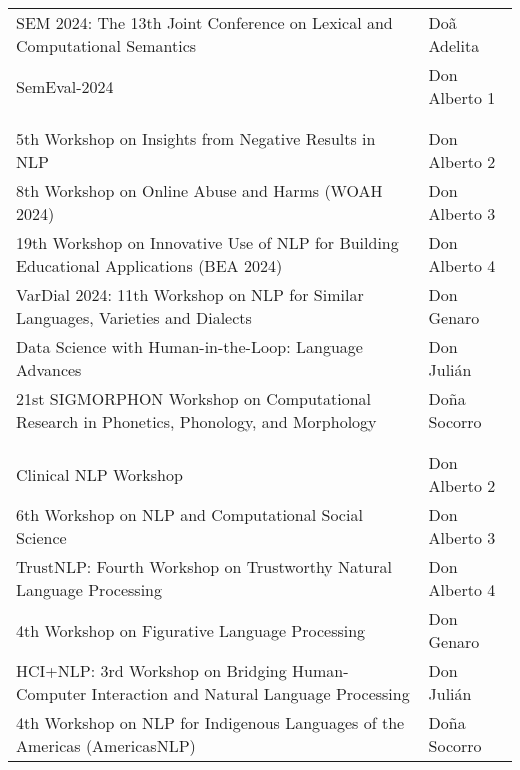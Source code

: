 \begin{center}
\renewcommand{\arraystretch}{1.1}
\vspace{-1em}
\begin{tabular}{@{}%
  >{\raggedright\arraybackslash}p{}
  >{\raggedright\arraybackslash}p{}}

  \multicolumn{2}{l}{\hspace{-1mm}\large Thursday--Friday} \\  \hline
  *SEM 2024: The 13th Joint Conference on Lexical and Computational Semantics & Do\~a Adelita \\
  SemEval-2024 & Don Alberto 1 \\
  \\

  \multicolumn{2}{l}{\hspace{-1mm}\large Thursday} \\ \hline
  5th Workshop on Insights from Negative Results in NLP & Don Alberto 2 \\
  8th Workshop on Online Abuse and Harms (WOAH 2024) & Don Alberto 3 \\
  19th Workshop on Innovative Use of NLP for Building Educational Applications (BEA 2024) & Don Alberto 4 \\
  VarDial 2024: 11th Workshop on NLP for Similar Languages, Varieties and Dialects & Don Genaro \\
  Data Science with Human-in-the-Loop: Language Advances & Don Juli\'an \\
  21st SIGMORPHON Workshop on Computational Research in Phonetics, Phonology, and Morphology & Do\~na Socorro \\
  \\

  \multicolumn{2}{l}{\hspace{-1mm}\large Friday} \\ \hline
  Clinical NLP Workshop & Don Alberto 2 \\
  6th Workshop on NLP and Computational Social Science & Don Alberto 3 \\
  TrustNLP: Fourth Workshop on Trustworthy Natural Language Processing & Don Alberto 4 \\
  4th Workshop on Figurative Language Processing & Don Genaro \\
  HCI+NLP: 3rd Workshop on Bridging Human-Computer Interaction and Natural Language Processing & Don Juli\'an \\
  4th Workshop on NLP for Indigenous Languages of the Americas (AmericasNLP) & Do\~na Socorro \\

\end{tabular}
\end{center}
